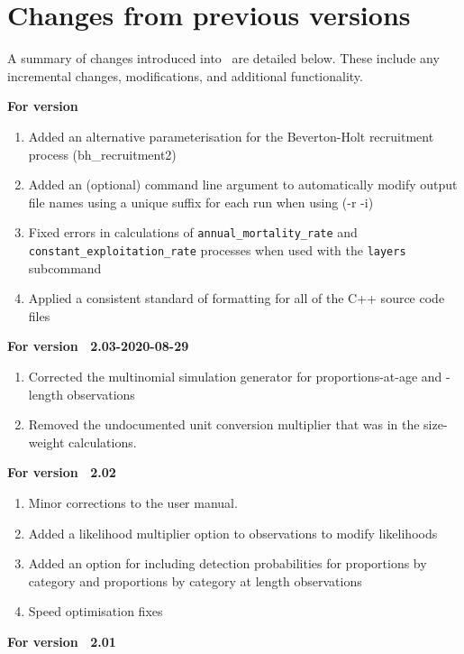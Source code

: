 \section{Changes from previous versions}

A summary of changes introduced into \SPM\ are detailed below. These include any incremental changes, modifications, and additional functionality.

\textbf{For version \SPM\ \VER}
\begin{enumerate}
  \item Added an alternative parameterisation for the Beverton-Holt recruitment process (bh\_recruitment2)
  \item Added an (optional) command line argument to automatically modify output file names using a unique suffix for each run when using (-r -i)
	\item Fixed errors in calculations of \texttt{annual\_mortality\_rate} and \texttt{constant\_exploitation\_rate} processes when used with the \texttt{layers} subcommand
	\item Applied a consistent standard of formatting for all of the C++ source code files
\end{enumerate}

\textbf{For version \SPM\ 2.03-2020-08-29}
\begin{enumerate}
  \item Corrected the multinomial simulation generator for proportions-at-age and -length observations
	\item Removed the undocumented unit conversion multiplier that was in the size-weight calculations.
\end{enumerate}

\textbf{For version \SPM\ 2.02}

\begin{enumerate}
  \item Minor corrections to the user manual.
	\item Added a likelihood multiplier option to observations to modify likelihoods
	\item Added an option for including detection probabilities for proportions by category and proportions by category at length observations
	\item Speed optimisation fixes
\end{enumerate}

\textbf{For version \SPM\ 2.01}

